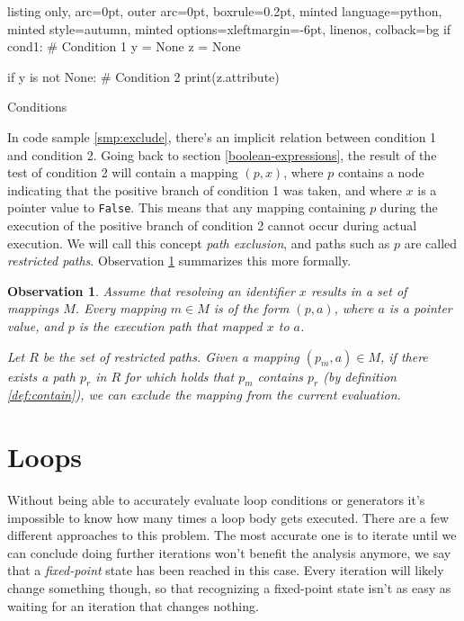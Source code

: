 \documentclass[a4paper, 16pt, oneside]{Thesis}
\newtheorem{observation}{Observation}
\begin{document}
\begin{code}
  \begin{tcblisting}{listing only, 
  arc=0pt,
  outer arc=0pt, 
  boxrule=0.2pt,
  minted language=python,
  minted style=autumn,
  minted options={xleftmargin=-6pt, linenos},
  colback=bg}
if cond1: # Condition 1
  y = None
  z = None
  
if y is not None: # Condition 2
  print(z.attribute)

\end{tcblisting}
\caption{Conditions} \label{smp:exclude}
\end{code}

In code sample \ref{smp:exclude}, there's an implicit relation between
condition 1 and condition 2. Going back to section
\ref{boolean-expressions}, the result of the test of condition 2 will
contain a mapping \((p, x)\), where \(p\) contains a node indicating
that the positive branch of condition 1 was taken, and where \(x\) is a
pointer value to \texttt{False}. This means that any mapping containing
\(p\) during the execution of the positive branch of condition 2 cannot
occur during actual execution. We will call this concept
\textit{path exclusion}, and paths such as \(p\) are called
\emph{restricted paths}. Observation \ref{obs:exclude} summarizes this
more formally.

\begin{observation}
\label{obs:exclude}
Assume that resolving an identifier $x$ results in a set of mappings $M$. Every mapping $m \in M$ is of the form $(p, a)$, where $a$ is a pointer value, and $p$ is the execution path that mapped $x$ to $a$. 

Let $R$ be the set of restricted paths. Given a mapping $(p_m, a) \in M$, if there exists a path $p_r$ in $R$ for which holds that $p_m$ contains $p_r$ (by definition \ref{def:contain}), we can exclude the mapping from the current evaluation. 
\end{observation}

\section{Loops}\label{loops}

Without being able to accurately evaluate loop conditions or generators
it's impossible to know how many times a loop body gets executed. There
are a few different approaches to this problem. The most accurate one is
to iterate until we can conclude doing further iterations won't benefit
the analysis anymore, we say that a \emph{fixed-point} state has been
reached in this case. Every iteration will likely change something
though, so that recognizing a fixed-point state isn't as easy as waiting
for an iteration that changes nothing.
\end{document}
